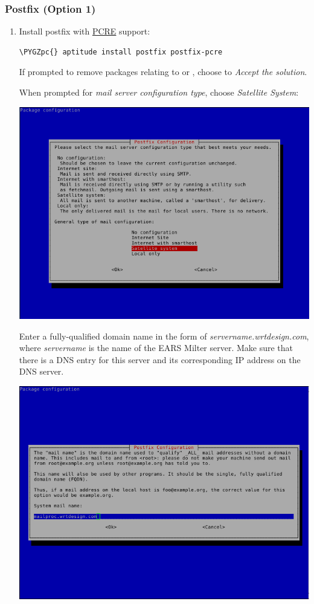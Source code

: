 \documentclass[letterpaper,10pt,english]{sphinxmanual}
\def\PYGZpc{\char`\%}
\begin{document}
\subsubsection{Postfix (Option 1)}
\label{installation:postfix-option-1}\begin{enumerate}
\item {} 
Install postfix with \href{http://www.pcre.org}{PCRE} support:

\begin{Verbatim}[commandchars=\\\{\},formatcom=\footnotesize]
\PYGZpc{} aptitude install postfix postfix-pcre
\end{Verbatim}

If prompted to remove packages relating to  or ,
choose to \emph{Accept the solution}.

When prompted for \emph{mail server configuration type}, choose
\emph{Satellite System}:

\includegraphics{postfix1.png}

Enter a fully-qualified domain name in the form of
\emph{servername.wrtdesign.com}, where \emph{servername} is the name of the EARS
Milter server. Make sure that there is a DNS entry for this server and its
corresponding IP address on the DNS server.

\includegraphics{postfix2.png}


\end{enumerate}
\end{document}

